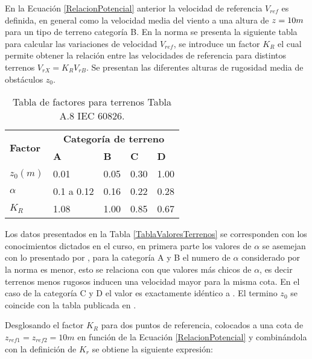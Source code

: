 En la Ecuación \eqref{RelacionPotencial} anterior la velocidad de referencia $V_{ref}$ es definida, en general como la velocidad media del viento a una altura de $z=10\vspace{.1cm}m$ para un tipo de terreno categoría B. En la norma se presenta la siguiente tabla para calcular las variaciones de velocidad $V_{ref}$, se introduce un factor $K_R$ el cual permite obtener la relación entre las velocidades de referencia para distintos terrenos $V_{rX}=K_RV_{rB}$. Se presentan las diferentes alturas de rugosidad media de obstáculos $z_0$.


\begin{table}[h] 
	\begin{footnotesize} 
		\begin{center} 
			\begin{tabular}{ |p{3cm}|p{2cm}|p{2cm}|p{2cm}|p{2cm}|} \hline
				\multirow{2}{*}{\textbf{Factor}}  & \multicolumn{4}{|c|}{ \textbf{Categoría de terreno} }  \\ 
				& \textbf{A}& \textbf{B} &\textbf{C}&\textbf{D}\\
				\hline
				$z_0(m)$   & 0.01    &0.05&  0.30 & 1.00\\ \hline
				$\alpha$& 0.1 a 0.12  & 0.16 & 0.22 &0.28\\ \hline
				$K_R$ & 1.08 &1.00 &0.85&  0.67\\ \hline
			\end{tabular}
		\end{center} 
		\caption{Tabla de factores para terrenos Tabla A.8 IEC 60826.}
	\end{footnotesize} 
	\label{TablaValoresTerrenos} 
\end{table}

Los datos presentados en la Tabla \eqref{TablaValoresTerrenos} se corresponden con los conocimientos dictados en el curso, en primera parte los valores de $\alpha$ se asemejan con lo presentado por \cite{Davenport1960}, para la categoría A y B el numero de $\alpha$ considerado por la norma es menor, esto se relaciona con que valores más chicos de $\alpha$, es decir terrenos menos rugosos inducen una velocidad mayor para la misma cota. En el caso de la categoría C y D el valor es exactamente idéntico a \cite{Davenport1960} . El termino $z_0$ se coincide con la tabla publicada en \cite{Oke2000}.

Desglosando el factor $K_R$ para dos puntos de referencia, colocados a una cota de $z_{ref1}=z_{ref2}=10m$ en función de la Ecuación \eqref{RelacionPotencial} y combinándola con la definición de $K_r$ se obtiene la siguiente expresión: 


